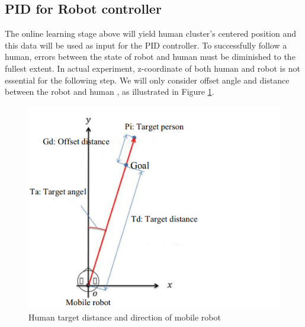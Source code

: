 

\newpage

\subsection{PID for Robot controller}
\label{pid_section}

The online learning stage above will yield human cluster's centered position and this data
will be used as input for the PID controller. To successfully follow a human, errors between the
state of robot and human must be diminished to the fullest extent. In actual experiment, z-coordinate of
both human and robot is not essential for the following step. We will only consider offset angle and distance
between the robot and human \cite{refchap2-fig1,DL_Color_feature}, as illustrated in Figure \ref{Chap3:Fig20}.

\begin{figure}[h]
    \centering
    \hspace*{2cm}
    \includegraphics[scale=0.8]{figures/chap3_fig/pid/pid_framework_2.png}
    \caption{Human target distance and direction of mobile robot \cite{hfr_lrs}}
    \label{Chap3:Fig20}
\end{figure}


